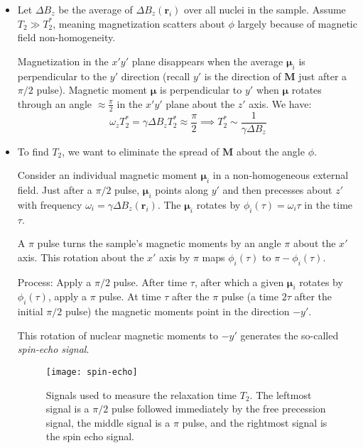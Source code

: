 \documentclass[11pt, a4paper]{article}
\renewcommand{\vec}[1]{\bm{#1}}
\newcommand{\m}{\vec{\mu}}  %
\newcommand{\M}{\vec{M}}  %
\begin{document}
\begin{itemize}
	\item Let $ \Delta B_{z} $ be the average of $ \Delta B_{z}(\vec{r}_{i}) $ over all nuclei in the sample. Assume $ T_{2} \gg T_{2}^{*} $, meaning magnetization scatters about $ \phi $ largely because of magnetic field non-homogeneity.
	
	Magnetization in the $ x'y' $ plane disappears when the average $ \m_{i} $ is perpendicular to the $ y' $ direction (recall $ y' $ is the direction of $ \M $ just after a $ \pi/2 $ pulse). Magnetic moment $ \m $ is perpendicular to $ y' $ when $ \m $ rotates through an angle $ \approx \frac{\pi}{2} $ in the $ x'y' $ plane about the $ z' $ axis. We have:
	\begin{equation*}
		\omega_{z} T_{2}^{*} = \gamma \Delta B_{z} T_{2}^{*} \approx \frac{\pi}{2} \implies T_{2}^{*} \sim \frac{1}{\gamma \Delta B_{z}}
	\end{equation*}
	
	\item To find $ T_{2} $, we want to eliminate the spread of $ \M $ about the angle $ \phi $. 
	
	Consider an individual magnetic moment $ \m_{i} $ in a non-homogeneous external field. Just after a $ \pi/2 $ pulse, $ \m_{i} $ points along $ y' $ and then precesses about $ z' $ with frequency $ \omega_{i} = \gamma \Delta B_{z}(\vec{r}_{i}) $. The $ \m_{i} $ rotates by $ \phi_{i}(\tau) = \omega_{i}\tau $ in the time $ \tau $.
	
	A $ \pi $ pulse turns the sample's magnetic moments by an angle $ \pi $ about the $ x' $ axis. This rotation about the $ x' $ axis by $ \pi $ maps $ \phi_{i}(\tau)  $ to $ \pi - \phi_{i}(\tau) $. 
	
	Process: Apply a $ \pi/2 $ pulse. After time $ \tau $, after which a given $ \m_{i} $ rotates by $ \phi_{i}(\tau) $, apply a $ \pi $ pulse. At time $ \tau $ after the $ \pi $ pulse (a time $ 2\tau $ after the initial $ \pi/2 $ pulse) the magnetic moments point in the direction $ -y' $.
	
	This rotation of nuclear magnetic moments to $ -y' $ generates the so-called \textit{spin-echo signal}.
	
	\begin{figure}
	\centering
	\texttt{[image: spin-echo]}
	\caption{Signals used to measure the relaxation time $ T_{2} $. The leftmost signal is a $ \pi/2 $ pulse followed immediately by the free precession signal, the middle signal is a $ \pi $ pulse, and the rightmost signal is the spin echo signal.}
	\label{nmr:fig:spin-echo-schematic}
	\end{figure}
	

\end{itemize}
\end{document}
